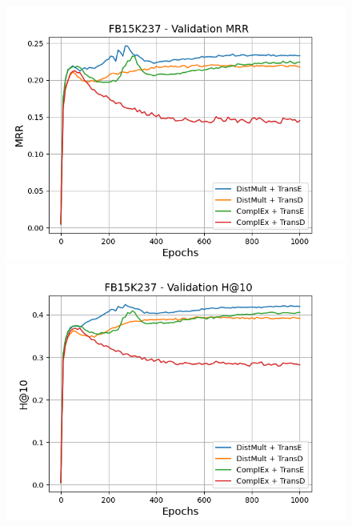 \begin{figure}[H]
    \centering
    \begin{minipage}{.5\textwidth}
      \centering
      \includegraphics[width=\linewidth]{figures/results/gan_train/not_pretrained/uncertainty/max/entropy/fb15k237/1k_epochs/uncertainty_fb15k237_mrrs.png}
    \end{minipage}%
    \begin{minipage}{.5\textwidth}
      \centering
      \includegraphics[width=\linewidth]{figures/results/gan_train/not_pretrained/uncertainty/max/entropy/fb15k237/1k_epochs/uncertainty_fb15k237_hit10.png}
    \end{minipage}
    

\end{figure}
